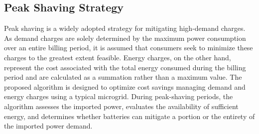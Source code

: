 \documentclass[conference]{IEEEtran}
\begin{document}
    \subsection{Peak Shaving Strategy}
		Peak shaving is a widely adopted strategy for mitigating high-demand charges. As demand charges are solely determined by the maximum power consumption over an entire billing period, it is assumed that consumers seek to minimize these charges to the greatest extent feasible. Energy charges, on the other hand, represent the cost associated with the total energy consumed during the billing period and are calculated as a summation rather than a maximum value. The proposed algorithm is designed to optimize cost savings managing demand and energy charges using a typical microgrid. During peak-shaving periods, the algorithm assesses the imported power, evaluates the availability of sufficient energy, and determines whether batteries can mitigate a portion or the entirety of the imported power demand.
\end{document}
